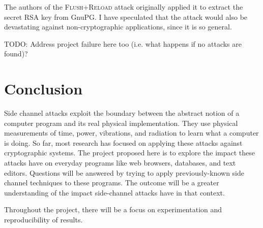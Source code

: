 \documentclass{acm_proc_article-sp}
\begin{document}
The authors of the \textsc{Flush+Reload} attack originally applied it to extract
the secret RSA key from GnuPG. I have speculated \cite{hornby2013flush} that the
attack would also be devastating against non-cryptographic applications, since
it is so general.

TODO: Address project failure here too (i.e. what happens if no attacks are
found)?

\section{Conclusion}

Side channel attacks exploit the boundary between the abstract notion of
a computer program and its real physical implementation. They use physical
measurements of time, power, vibrations, and radiation to learn what a computer
is doing. So far, most research has focused on applying these attacks against
cryptographic systems. The project proposed here is to explore the impact these
attacks have on everyday programs like web browsers, databases, and text
editors. Questions will be answered by trying to apply previously-known side
channel techniques to these programs. The outcome will be a greater
understanding of the impact side-channel attacks have in that context.

Throughout the project, there will be a focus on experimentation and
reproducibility of results.



\end{document}
